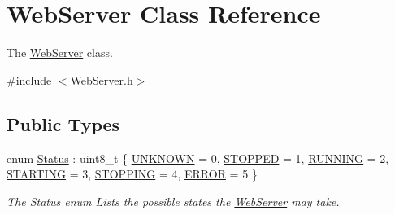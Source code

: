 \hypertarget{classWebServer}{}\section{Web\+Server Class Reference}
\label{classWebServer}


The \hyperlink{classWebServer}{Web\+Server} class.  




{\ttfamily \#include $<$Web\+Server.\+h$>$}

\subsection*{Public Types}
\begin{DoxyCompactItemize}
\item 
enum \hyperlink{classWebServer_a350f14f5d1522610502fb95f346e4a3c}{Status} \+: uint8\+\_\+t \{ \newline
\hyperlink{classWebServer_a350f14f5d1522610502fb95f346e4a3ca1d451f0e2a986b2d755301fc16327831}{U\+N\+K\+N\+O\+WN} = 0, 
\hyperlink{classWebServer_a350f14f5d1522610502fb95f346e4a3ca8dd909a7ebd4b0b25ef0af0c754deb53}{S\+T\+O\+P\+P\+ED} = 1, 
\hyperlink{classWebServer_a350f14f5d1522610502fb95f346e4a3caf0cc930cb72ab6a5d0bca765bab81c19}{R\+U\+N\+N\+I\+NG} = 2, 
\hyperlink{classWebServer_a350f14f5d1522610502fb95f346e4a3ca229029746647a912e8c8f8366f2efacb}{S\+T\+A\+R\+T\+I\+NG} = 3, 
\newline
\hyperlink{classWebServer_a350f14f5d1522610502fb95f346e4a3ca46f07f457962a112a550b7b69a7dcdb8}{S\+T\+O\+P\+P\+I\+NG} = 4, 
\hyperlink{classWebServer_a350f14f5d1522610502fb95f346e4a3ca2187c4c7fce9bed9a2f66b8e835676e7}{E\+R\+R\+OR} = 5
 \}\begin{DoxyCompactList}\small\item\em The Status enum Lists the possible states the \hyperlink{classWebServer}{Web\+Server} may take. \end{DoxyCompactList}
\end{DoxyCompactItemize}
